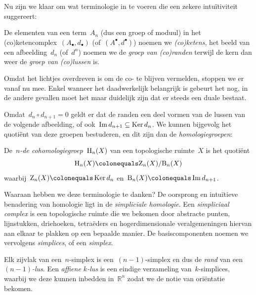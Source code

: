 \documentclass[a4paper,11pt,openany,oneside,article]{memoir}
\begin{document}
Nu zijn we klaar om wat terminologie in te voeren die een zekere intu\"itiviteit suggereert:

\begin{definition}
  De elementen van een term~$A_n$ (dus een groep of moduul) in het (co)ketencomplex~$(A_\bullet,d_\bullet)$ (of~$(A^\bullet,d^\bullet)$) noemen we \emph{(co)ketens}, het beeld van een afbeelding~$d_n$ (of~$d^n$) noemen we de \emph{groep van (co)randen} terwijl de kern dan weer de \emph{groep van (co)lussen} is.
\end{definition}

Omdat het lichtjes overdreven is om de co- te blijven vermelden, stoppen we er vanaf nu mee. Enkel wanneer het daadwerkelijk belangrijk is gebeurt het nog, in de andere gevallen moet het maar duidelijk zijn dat er steeds een duale bestaat.

Omdat~$d_{n}\circ d_{n+1}=0$ geldt er dat de randen een deel vormen van de lussen van de volgende afbeelding, of ook~$\operatorname{Im} d_{n+1}\subseteq\operatorname{Ker} d_n$. We kunnen bijgevolg het quoti\"ent van deze groepen bestuderen, en dit zijn dan de \emph{homologiegroepen}:

\begin{definition}
  De~\emph{$n$-de cohomologiegroep}~$\mathrm{H}_n(X)$ van een topologische ruimte~$X$ is het quoti\"ent
  \begin{equation}
    \homologyGroup_n(X)\colonequals\cycleGroup_n(X)/\boundaryGroup_n(X)
  \end{equation}
  waarbij~$\cycleGroup_n(X)\colonequals\Ker d_n$ en~$\boundaryGroup_n(X)\colonequals\Image d_{n+1}$.
\end{definition}

Waaraan hebben we deze terminologie te danken? De oorsprong en intu\"itieve benadering van homologie ligt in de \emph{simpliciale homologie}. Een \emph{simpliciaal complex} is een topologische ruimte die we bekomen door abstracte punten, lijnstukken, driehoeken, tetra\"eders en hogerdimensionale veralgemeningen hiervan aan elkaar te plakken op een bepaalde manier. De basiscomponenten noemen we vervolgens \emph{simplices}, of een \emph{simplex}.

Elk zijvlak van een~$n$\nobreakdash-simplex is een~$(n-1)$\nobreakdash-simplex en dus de \emph{rand} van een \emph{$(n-1)$\nobreakdash-lus}. Een \emph{affiene $k$\nobreakdash-lus} is een eindige verzameling van~$k$\nobreakdash-simplices, waarbij we deze kunnen inbedden in~$\mathbb{R}^n$ zodat we de notie van ori\"entatie bekomen.
\end{document}
